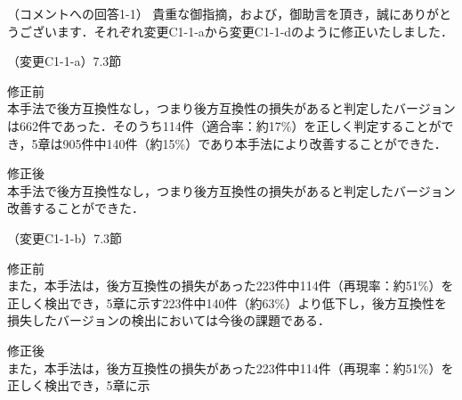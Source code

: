\documentclass{jarticle} %
\def\subsection#1{ \vspace{1pc} {\gt #1} }
\begin{document}
\subsection{（コメントへの回答1-1）}
貴重な御指摘，および，御助言を頂き，誠にありがとうございます．それぞれ変更C1-1-aから変更C1-1-dのように修正いたしました．

\subsection{（変更C1-1-a）7.3節}
\vspace{-0.3cm}
\begin{description}
\item 修正前\\
\phantom{　}
本手法で後方互換性なし，つまり後方互換性の損失があると判定したバージョンは662件であった．そのうち114件（適合率：約17\%）を正しく判定することができ，5章は905件中140件（約15\%）であり本手法により改善することができた．
\vspace{-0.3cm}
\item 修正後\\
\phantom{　}
本手法で後方互換性なし，つまり後方互換性の損失があると判定したバージョン\textcolor{red}{}改善することができた．
\end{description}

\subsection{（変更C1-1-b）7.3節}
\vspace{-0.3cm}
\begin{description}
\item 修正前\\
\phantom{　}
また，本手法は，後方互換性の損失があった223件中114件（再現率：約51\%）を正しく検出でき，5章に示す223件中140件（約63\%）より低下し，後方互換性を損失したバージョンの検出においては今後の課題である．
\vspace{-0.3cm}
\item 修正後\\
\phantom{　}
また，本手法は，後方互換性の損失があった223件中114件（再現率：約51\%）を正しく検出でき，5章に示\textcolor{red}{}
\end{description}
\end{document}
